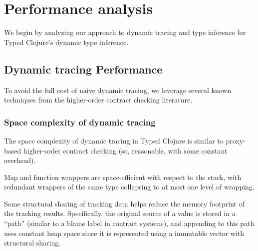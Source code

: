 \chapter{Performance analysis}


We begin by analyzing our approach to dynamic tracing and type inference
for Typed Clojure's dynamic type inference.

\section{Dynamic tracing Performance}

To avoid the full cost of naive dynamic tracing, we leverage several
known techniques from the higher-order contract checking literature.

\subsection{Space complexity of dynamic tracing}

The space complexity of dynamic tracing in Typed Clojure is similar
to proxy-based higher-order contract checking (so, reasonable, with
some constant overhead).

Map and function wrappers are space-efficient with respect to the stack, with
redundant wrappers of the same type collapsing to at most one level of wrapping.

Some structural sharing of tracking data helps reduce the memory footprint
of the tracking results. Specifically, the original source of a value
is stored in a ``path'' (similar to a blame label in contract systems),
and appending to this path uses constant heap space since it is represented
using a immutable vector with structural sharing.


